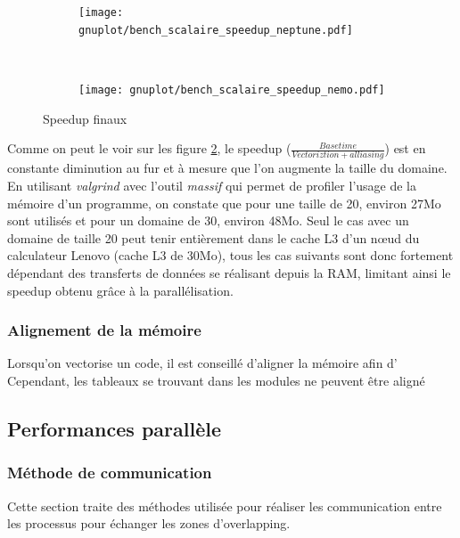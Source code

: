 \begin{figure}[!ht]
  \centering
  \begin{subfigure}[b]{0.5\textwidth}
    \centering
    \texttt{[image: gnuplot/bench\_scalaire\_speedup\_neptune.pdf]}
  \caption{\label{fig:bench_scal_neptune_speedup}}
  \end{subfigure}%
  ~
  \begin{subfigure}[b]{0.5\textwidth}
    \centering
    \texttt{[image: gnuplot/bench\_scalaire\_speedup\_nemo.pdf]}
  \caption{\label{fig:bench_scal_nemo_speedup}}
  \end{subfigure}
  \caption{\label{fig:bench_scal_speedups}Speedup finaux}
\end{figure}

Comme on peut le voir sur les figure \ref{fig:bench_scal_nemo_speedup}, le speedup ($\frac{Base time}{Vectoriztion+alliasing}$) est en constante diminution au fur et à mesure que l'on augmente la taille du domaine. En utilisant \textit{valgrind} avec l'outil \textit{massif} qui permet de profiler l'usage de la mémoire d'un programme, on constate que pour une taille de 20, environ 27Mo sont utilisés et pour un domaine de 30, environ 48Mo. Seul le cas avec un domaine de taille 20 peut tenir entièrement dans le cache L3 d'un nœud du calculateur Lenovo (cache L3 de 30Mo), tous les cas suivants sont donc fortement dépendant des transferts de données se réalisant depuis la RAM, limitant ainsi le speedup obtenu grâce à la parallélisation.

\subsubsection{Alignement de la mémoire}
Lorsqu'on vectorise un code, il est conseillé d'aligner la mémoire afin d'
Cependant, les tableaux se trouvant dans les modules ne peuvent être aligné



\subsection{Performances parallèle}


\subsubsection{Méthode de communication}
Cette section traite des méthodes utilisée pour réaliser les communication entre les processus pour échanger les zones d'overlapping.



